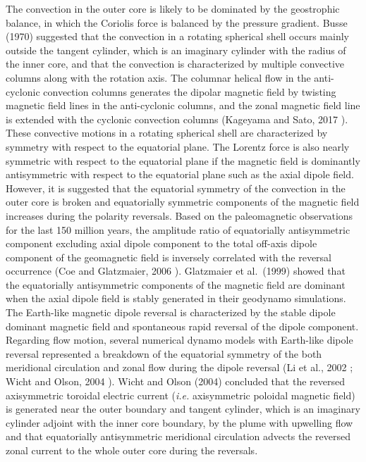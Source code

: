 The convection in the outer core is likely to be dominated by the geostrophic balance, in which the Coriolis force is balanced by the pressure gradient.
Busse (1970) \cite{Busse:1970} suggested that the convection in a rotating spherical shell occurs mainly outside the tangent cylinder, which is an imaginary cylinder with the radius of the inner core, and that the convection is characterized by multiple convective columns along with the rotation axis. 
The columnar helical flow in the anti-cyclonic convection columns generates the dipolar magnetic field by twisting magnetic field lines in the anti-cyclonic columns, and the zonal magnetic field line is extended with the cyclonic convection columns (Kageyama and Sato, 2017 \cite{Kageyama:97c}). 
{\color{red}
These convective motions in a rotating spherical shell are characterized by symmetry with respect to the equatorial plane.
The Lorentz force is also nearly symmetric with respect to the equatorial plane if the magnetic field is dominantly antisymmetric with respect to the equatorial plane such as the axial dipole field.
}
However, it is suggested that the equatorial symmetry of the convection in the outer core is broken and equatorially symmetric components of the magnetic field increases during the polarity reversals. %
Based on the paleomagnetic observations for the last 150 million years, the amplitude ratio of equatorially antisymmetric component excluding axial dipole component to the total off-axis dipole component of the geomagnetic field is inversely correlated with the reversal occurrence (Coe and Glatzmaier, 2006 \cite{Coe:2006}). 
Glatzmaier et al.\ (1999) \cite{Glatzmaier:1999} showed that the equatorially antisymmetric components of the magnetic field are dominant when the axial dipole field is stably generated in their geodynamo simulations. 
The Earth-like magnetic dipole reversal is characterized by the stable dipole dominant magnetic field and spontaneous rapid reversal of the dipole component. 
Regarding flow motion, several numerical dynamo models with Earth-like dipole reversal represented a breakdown of the equatorial symmetry of the both meridional circulation and zonal flow  during the dipole reversal (Li et al., 2002 \cite{Li:2002}; Wicht and Olson, 2004 \cite{Wicht:2004}).
Wicht and Olson (2004) \cite{Wicht:2004} concluded that the reversed axisymmetric toroidal electric current ({\it i.e.} axisymmetric poloidal magnetic field) is generated near the outer boundary and tangent cylinder, which is an imaginary cylinder adjoint with the inner core boundary, by the plume with upwelling flow and that equatorially antisymmetric meridional circulation advects the reversed zonal current to the whole outer core during the reversals.

